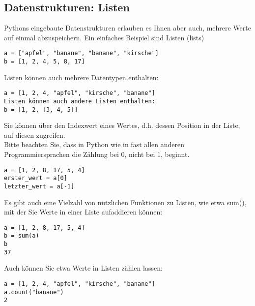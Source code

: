 \documentclass{article}
\begin{document}
\subsection{Datenstrukturen: Listen}
Pythons eingebaute Datenstrukturen erlauben es Ihnen aber auch, mehrere Werte auf einmal abzuspeichern. Ein einfaches Beispiel sind Listen (lists)
\begin{verbatim}
a = ["apfel", "banane", "banane", "kirsche"]
b = [1, 2, 4, 5, 8, 17]
\end{verbatim}
Listen können auch mehrere Datentypen enthalten:
\begin{verbatim}
a = [1, 2, 4, "apfel", "kirsche", "banane"]
Listen können auch andere Listen enthalten:
b = [1, 2, [3, 4, 5]]
\end{verbatim}
Sie können über den Indexwert eines Wertes, d.h. dessen Position in der Liste, auf diesen zugreifen.\\
Bitte beachten Sie, dass in Python wie in fast allen anderen Programmiersprachen die Zählung bei 0, nicht bei 1, beginnt.\\
\begin{verbatim}
a = [1, 2, 8, 17, 5, 4]
erster_wert = a[0]
letzter_wert = a[-1]
\end{verbatim}
Es gibt auch eine Vielzahl von nützlichen Funktionen zu Listen, wie etwa sum(), mit der Sie Werte in einer Liste aufaddieren können:
\begin{verbatim}
a = [1, 2, 8, 17, 5, 4]
b = sum(a)
b
37
\end{verbatim}
Auch können Sie etwa Werte in Listen zählen lassen:
\begin{verbatim}
a = [1, 2, 4, "apfel", "kirsche", "banane"]
a.count("banane")
2
\end{verbatim}

\newpage
\end{document}
